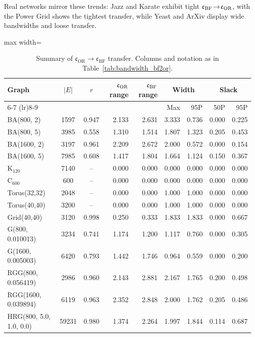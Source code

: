 \documentclass[twoside,11pt]{article}
\numberwithin{equation}{section}
\numberwithin{theorem}{section}
\numberwithin{example}{section}
\begin{document}
Real networks mirror these trends: Jazz and Karate exhibit tight $\mathfrak c_{\rm BF}\!\to\!\mathfrak c_{\rm OR}$, with the Power Grid shows the tightest transfer, while Yeast and ArXiv display wide bandwidths and loose transfer.

\begin{table}
\centering
\caption{Summary of $\mathfrak c_{\mathrm{OR}}\!\to\!\mathfrak c_{\mathrm{BF}}$ transfer. 
Columns and notation as in Table~\ref{tab:bandwidth_bf2or}.}
\label{tab:bandwidth_or2bf}
\begin{adjustbox}{max width=\textwidth}
\footnotesize
\setlength{\tabcolsep}{4pt}
\begin{tabular}{l c c r r r r r r}
\toprule
Graph & $|E|$ & $r$ & $\mathfrak c_{\rm OR}$ range & $\mathfrak c_{\rm BF}$ range & \multicolumn{2}{c}{Width} & \multicolumn{2}{c}{Slack} \\
\cmidrule(lr){6-7} \cmidrule(lr){8-9}
& & & & & Max & 95P & 50P & 95P \\
\midrule
BA(800, 2) & 1597 & 0.947 & 2.133 & 2.631 & 3.333 & 0.736 & 0.000 & 0.225 \\
BA(800, 5) & 3985 & 0.558 & 1.310 & 1.514 & 1.807 & 1.323 & 0.205 & 0.453 \\
BA(1600, 2) & 3197 & 0.961 & 2.209 & 2.672 & 2.000 & 0.572 & 0.000 & 0.154 \\
BA(1600, 5) & 7985 & 0.608 & 1.417 & 1.804 & 1.664 & 1.124 & 0.150 & 0.367 \\
K$_{120}$ & 7140 & -- & 0.000 & 0.000 & 0.000 & 0.000 & 0.000 & 0.000 \\
C$_{600}$ & 600 & -- & 0.000 & 0.000 & 0.000 & 0.000 & 0.000 & 0.000 \\
Torus(32,32) & 2048 & -- & 0.000 & 0.000 & 1.000 & 1.000 & 0.000 & 0.000 \\
Torus(40,40) & 3200 & -- & 0.000 & 0.000 & 1.000 & 1.000 & 0.000 & 0.000 \\
Grid(40,40) & 3120 & 0.998 & 0.250 & 0.333 & 1.833 & 1.833 & 0.000 & 0.667 \\
G(800, 0.010013) & 3234 & 0.741 & 1.174 & 1.200 & 1.117 & 0.760 & 0.000 & 0.305 \\
G(1600, 0.005003) & 6420 & 0.793 & 1.442 & 1.746 & 0.964 & 0.559 & 0.000 & 0.200 \\
RGG(800, 0.056419) & 2986 & 0.960 & 2.143 & 2.881 & 2.167 & 1.765 & 0.200 & 0.498 \\
RGG(1600, 0.039894) & 6119 & 0.963 & 2.352 & 2.848 & 2.000 & 1.762 & 0.205 & 0.486 \\
HRG(800, 5.0, 1.0, 0.0) & 59231 & 0.980 & 1.374 & 2.264 & 1.997 & 1.844 & 0.114 & 0.687 \\

\end{tabular}
\end{adjustbox}
\end{table}
\end{document}
